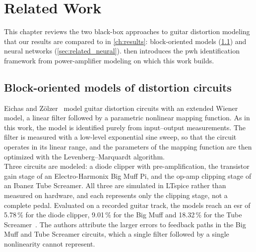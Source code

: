 \chapter{Related Work}
\label{ch:related_work}




This chapter reviews the two black-box approaches to guitar distortion modeling that our results are compared to in \cref{ch:results}: block-oriented models (\cref{sec:related_block}) and neural networks (\cref{sec:related_neural}).  then introduces the \gls{pwh} identification framework from power-amplifier modeling on which this work builds.

\section{Block-oriented models of distortion circuits}
\label{sec:related_block}

Eichas and Zölzer~\cite{eichas2016blackbox} model guitar distortion circuits with an extended Wiener model, a linear filter followed by a parametric nonlinear mapping function. As in this work, the model is identified purely from input--output measurements. The filter is measured with a low-level exponential sine sweep, so that the circuit operates in its linear range, and the parameters of the mapping function are then optimized with the Levenberg--Marquardt algorithm.\\

Three circuits are modeled: a diode clipper with pre-amplification, the transistor gain stage of an Electro-Harmonix Big Muff Pi, and the op-amp clipping stage of an Ibanez Tube Screamer. All three are simulated in LTspice rather than measured on hardware, and each represents only the clipping stage, not a complete pedal. Evaluated on a recorded guitar track, the models reach an \gls{esr} of 5.78\,\% for the diode clipper, 9.01\,\% for the Big Muff and 18.32\,\% for the Tube Screamer~\cite{eichas2016blackbox}. The authors attribute the larger errors to feedback paths in the Big Muff and Tube Screamer circuits, which a single filter followed by a single nonlinearity cannot represent.\\

